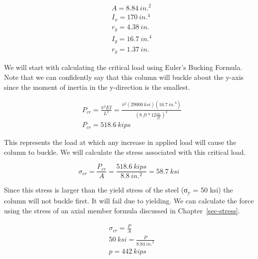 \documentclass[
  letterpaper,
  DIV=11,
  numbers=noendperiod]{scrreprt}
\theoremstyle{definition}
\theoremstyle{remark}
\begin{document}
\begin{tcolorbox}
\begin{tcolorbox}
\[
\begin{aligned}
& A=8.84{~in.}^2 \\
& I_x=170{~in.}^4 \\
& r_y=4.38{~in.} \\
& I_y=16.7{~in.}^4 \\
& r_y=1.37{~in.}
\end{aligned}
\]

We will start with calculating the critical load using Euler's Bucking
Formula. Note that we can confidently say that this column will buckle
about the y-axis since the moment of inertia in the y-direction is the
smallest.

\[
\begin{aligned}
& P_{cr}=\frac{\pi^2 E I}{L^2}=\frac{\pi^2(29000{~ksi})(16.7{~in.}^4)}{\left(8{~ft}* 12\frac{in.}{ft}\right)^2} \\
& P_{cr}=518.6{~kips}
\end{aligned}
\]

This represents the load at which any increase in applied load will
cause the column to buckle. We will calculate the stress associated with
this critical load.

\[
\sigma_{c r}=\frac{P_{cr}}{A}=\frac{518.6{~kips}}{8.8{~in.^2}}=58.7{~ksi}
\]

Since this stress is larger than the yield stress of the steel
(σ\textsubscript{y} = 50 ksi) the column will not buckle first. It will
fail due to yielding. We can calculate the force using the stress of an
axial member formula discussed in Chapter~\ref{sec-stress}.

\[
\begin{aligned}
&\sigma_{cr} =\frac{P}{A} \\
& 50{~ksi} =\frac{P}{8.84{~in.}^2} \\
&p =442{~kips}
\end{aligned}
\]

\end{tcolorbox}

\end{tcolorbox}
\end{document}
